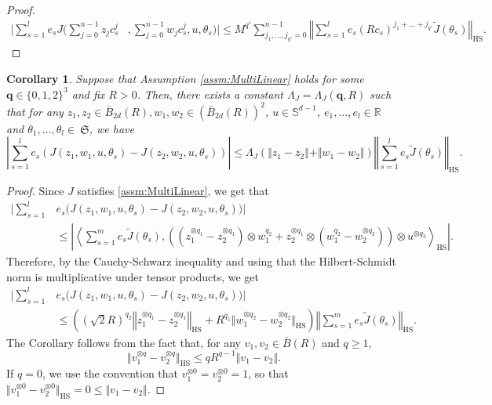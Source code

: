 \documentclass{article}
\newtheorem{corollary}[theorem]{Corollary}
\newcommand{\R}{\mathbb{R}}
\begin{document}
\begin{appendices}
\begin{proof}
\begin{align*}
     \bigg|\sum_{s=1}^{l} e_s J\bigg(\sum_{j=0}^{n-1} z_j c^j_{s}&,\sum_{j=0}^{n-1} w_jc^j_{s}, u,\theta_s\bigg) \bigg| \le M^{q'}\sum_{j_1,\ldots,j_{q'}=0}^{n-1}  \left\Vert\sum_{s=1}^{l} e_s (Rc_s)^{j_1+\ldots+j_{q'}}\widetilde J(\theta_s)\right\Vert_\mathrm{HS} .
\end{align*}
\end{proof}
\begin{corollary}\label{corr:LipJ}
    Suppose that Assumption \ref{assm:MultiLinear} holds for some $\bm q\in \{0,1,2\}^3$ and fix $R>0$. Then, there exists a constant $\Lambda_J=\Lambda_J(\bm q,R)$ such that for any $z_1,z_2\in \bar B_{2d}(R), w_1,w_2\in (\bar B_{2d}(R))^2$, $u \in \mathbb S^{d-1}$, $ e_1,\ldots ,e_l \in \R$ and $\theta_1 ,\ldots,\theta_l\in\ \mathfrak{S}$, we have 
\begin{equation*}
    \left|\sum_{s=1}^l e_s \left( J(z_1,w_1,u,\theta_s)-J(z_2,w_2,u,\theta_s)\right)\right|\le\Lambda_J\left( \Vert z_1-z_2 \Vert + \Vert w_1-w_2 \Vert \right)\left\Vert \sum_{s=1}^l e_s \widetilde J(\theta_s)\right\Vert_\mathrm{HS}.
\end{equation*}
\end{corollary}
\begin{proof}
Since $J$ satisfies \ref{assm:MultiLinear}, we get that
\begin{align*}
  \bigg|\sum_{s=1}^l &e_s \bigg( J(z_1,w_1,u,\theta_s)-J(z_2,w_2,u,\theta_s)\bigg)\bigg|\\&\le  \left\vert \left\langle \sum_{s=1}^m  e_s \widetilde J(\theta_s), \left(\left(z_1^{\otimes q_1}-z_2^{\otimes q_1}\right)\otimes w_1^{q_2}+z_2^{\otimes q_1}\otimes \left(w_1^{q_2}-w_2^{\otimes q_2}\right)\right)\otimes u^{\otimes q_3}\right\rangle_\mathrm{HS}\right\vert. 
\end{align*}
Therefore, by the Cauchy-Schwarz inequality and using that the Hilbert-Schmidt norm is multiplicative under tensor products, we get
\begin{align*}
  \bigg|\sum_{s=1}^l &e_s \bigg( J(z_1,w_1,u,\theta_s)-J(z_2,w_2,u,\theta_s)\bigg)\bigg|\\&\le   \left((\sqrt{2}R)^{q_2}\left\Vert z_1^{\otimes q_1}-z_2^{\otimes q_1}\right\Vert_{\mathrm{HS}}+R^{q_1} \Vert w_1^{\otimes  q_2}-w_2^{\otimes q_2}\Vert_{\mathrm{HS}}\right)\left\Vert  \sum_{s=1}^m  e_s \widetilde J(\theta_s)\right\Vert_\mathrm{HS}. 
\end{align*}
The Corollary follows from the fact that, for any $v_1,v_2\in \bar B(R)$ and $q\ge1 $,
\[
\Vert v_1^{\otimes q}-v_2^{\otimes q}\Vert_\mathrm{HS}\le qR^{q-1}\Vert v_1-v_2\Vert.
\]
If $q= 0$, we use the convention that  $v_1^{\otimes 0}=v_2^{\otimes 0}=1$, so that $\Vert v_1^{\otimes 0}-v_2^{\otimes 0}\Vert_\mathrm{HS}=0\le \Vert v_1-v_2\Vert$.
\end{proof}


\end{appendices}
\end{document}
